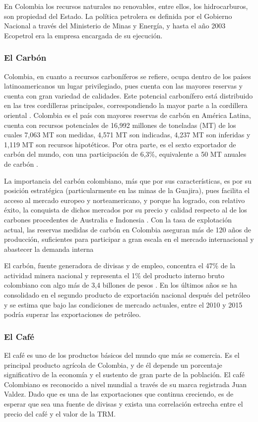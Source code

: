En Colombia los recursos naturales no renovables, entre ellos, los hidrocarburos, son propiedad del Estado. La política petrolera es definida por el Gobierno Nacional a través del Ministerio de Minas y Energía, y hasta el año 2003 Ecopetrol era la empresa encargada de su ejecución.

\subsubsection{El Carbón}
Colombia, en cuanto a recursos carboníferos se refiere, ocupa dentro de los países latinoamericanos un lugar privilegiado, pues cuenta con las mayores reservas y cuenta con gran variedad de calidades. Este potencial carbonífero está distribuido en las tres cordilleras principales, correspondiendo la mayor parte a la cordillera oriental \cite{cardenas}. Colombia es el país con mayores reservas de carbón en América Latina, cuenta con recursos potenciales de 16,992 millones de toneladas (MT) de los cuales 7,063 MT son medidas, 4,571 MT son indicadas, 4,237 MT son inferidas y 1,119 MT son recursos hipotéticos. Por otra parte, es el sexto exportador de carbón del mundo, con una participación de 6,3\%, equivalente a 50 MT anuales de carbón \cite{carbonMain}.

La importancia del carbón colombiano, más que por sus características, es por su posición estratégica (particularmente en las minas de la Guajira), pues facilita el acceso al mercado europeo y norteamericano, y porque ha logrado, con relativo éxito, la conquista de dichos mercados por su precio y calidad respecto al de los carbones procedentes de Australia e Indonesia \cite{cardenas}. Con la tasa de explotación actual, las reservas medidas de carbón en Colombia aseguran más de 120 años de producción, suficientes para participar a gran escala en el mercado internacional y abastecer la demanda interna \cite{carbonMain}

El carbón, fuente generadora de divisas y de empleo, concentra el 47\% de la actividad minera nacional y representa el 1\% del producto interno bruto colombiano con algo más de 3,4 billones de pesos \cite{carbonMain}. En los últimos años se ha consolidado en el segundo producto de exportación nacional  después del petróleo y se estima que bajo las condiciones de mercado actuales, entre el 2010 y 2015 podría superar las exportaciones de petróleo.

\subsubsection{El Café}
El café es uno de los productos básicos del mundo que más se comercia. Es el principal producto agrícola de Colombia, y de él depende un porcentaje significativo de la economía y el sustento de gran parte de la población. El café Colombiano es reconocido a nivel mundial a través de su marca registrada Juan Valdez. Dado que es una de las exportaciones que continua creciendo, es de esperar que sea una fuente de divisas y exista una correlación estrecha entre el precio del café y el valor de la TRM.

